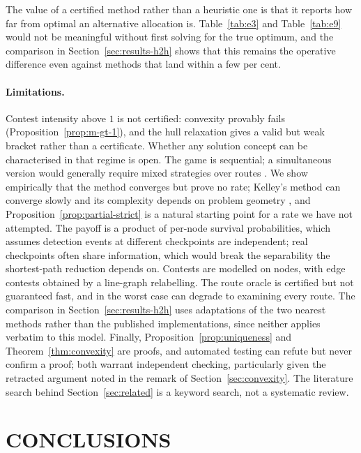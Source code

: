 \documentclass[10pt,a4paper,twoside]{article}
\theoremstyle{plain}
\theoremstyle{definition}
\begin{document}
The value of a certified method rather than a heuristic one is that it
reports how far from optimal an alternative allocation is.
Table~\ref{tab:e3} and Table~\ref{tab:e9} would not be meaningful without
first solving for the true optimum, and the comparison in
Section~\ref{sec:results-h2h} shows that this remains the operative
difference even against methods that land within a few per cent.

\paragraph{Limitations.}
Contest intensity above $1$ is not certified: convexity provably fails
(Proposition~\ref{prop:m-gt-1}), and the hull relaxation gives a valid but
weak bracket rather than a certificate. Whether any solution concept can be
characterised in that regime is open. The game is sequential; a simultaneous
version would generally require mixed strategies over routes
\citep{nguyen2023}. We show empirically that the method converges but prove
no rate; Kelley's method can converge slowly and its complexity depends on
problem geometry \citep{nesterov2018}, and
Proposition~\ref{prop:partial-strict} is a natural starting point for a rate
we have not attempted. The payoff is a product of per-node survival
probabilities, which assumes detection events at different checkpoints are
independent; real checkpoints often share information, which would break the
separability the shortest-path reduction depends on. Contests are modelled on
nodes, with edge contests obtained by a line-graph relabelling. The route
oracle is certified but not guaranteed fast, and in the worst case can
degrade to examining every route. The comparison in
Section~\ref{sec:results-h2h} uses adaptations of the two nearest methods
rather than the published implementations, since neither applies verbatim to
this model. Finally, Proposition~\ref{prop:uniqueness} and
Theorem~\ref{thm:convexity} are proofs, and automated testing can refute but
never confirm a proof; both warrant independent checking, particularly given
the retracted argument noted in the remark of Section~\ref{sec:convexity}.
The literature search behind Section~\ref{sec:related} is a keyword search,
not a systematic review.

\section{CONCLUSIONS}
\label{sec:conclusion}
\end{document}
